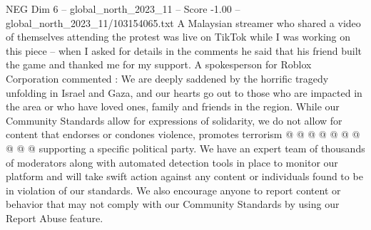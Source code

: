 \begin{textsample}{NEG Dim 6 – global\_north\_2023\_11 – Score -1.00 – global\_north\_2023\_11/103154065.txt}
A Malaysian streamer who shared a video of themselves attending the protest was live on TikTok while I was working on this piece -- when I asked for details in the comments he said that his friend built the game and thanked me for my support.
A spokesperson for Roblox Corporation commented : We are deeply saddened by the horrific tragedy unfolding in Israel and Gaza, and our hearts go out to those who are impacted in the area or who have loved ones, family and friends in the region.
While our Community Standards allow for expressions of solidarity, we do not allow for content that endorses or condones violence, promotes terrorism @ @ @ @ @ @ @ @ @ @ supporting a specific political party.
We have an expert team of thousands of moderators along with automated detection tools in place to monitor our platform and will take swift action against any content or individuals found to be in violation of our standards.
We also encourage anyone to report content or behavior that may not comply with our Community Standards by using our Report Abuse feature.

\end{textsample}

